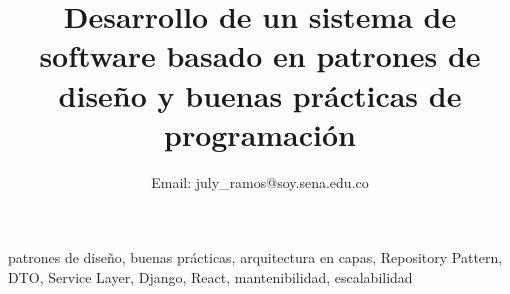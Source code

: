 \documentclass[conference]{IEEEtran}
\begin{document}
\title{Desarrollo de un sistema de software basado en patrones de diseño y buenas prácticas de programación}

\author{
Email: july_ramos@soy.sena.edu.co
}

\maketitle
\begin{abstract}

\end{abstract}

\begin{IEEEkeywords}
patrones de diseño, buenas prácticas, arquitectura en capas, Repository Pattern, DTO, Service Layer, Django, React, mantenibilidad, escalabilidad
\end{IEEEkeywords}











\printbibliography
\end{document}
